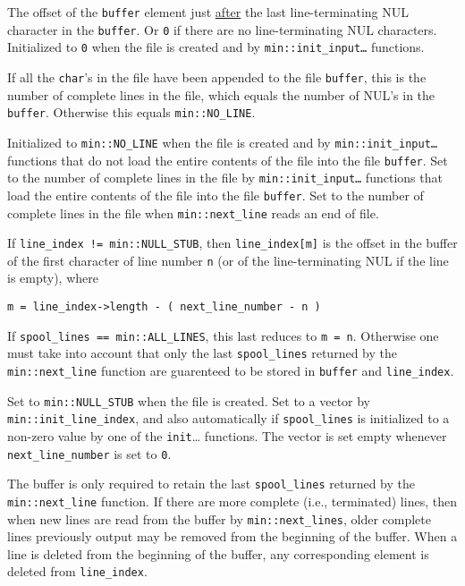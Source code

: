 \documentclass[12pt]{article}
\makeatletter
\newcommand{\ttmkey}[2]{{\tt \bf #1}\index{#1@{\tt #1}!#2}}
\newcommand{\EOL}{\penalty \exhyphenpenalty}
\newenvironment{itemlist}[1][1.2in]%
	{\begin{list}{}{\setlength{\labelwidth}{#1}%
		        \setlength{\leftmargin}{\labelwidth}%
		        \addtolength{\leftmargin}{+0.2in}%
		        \renewcommand{\makelabel}[1]{##1\hfill}}}%
	{\end{list}}
\makeatother
\begin{document}
\begin{itemlist}[1.4in]
\item[\ttmkey{end\_\EOL offset}{in {\tt min::file}}]
The offset of the {\tt buffer} element just \underline{after} the last
line-terminating NUL character in the {\tt buffer}.  Or {\tt 0} if there
are no line-terminating NUL characters.
Initialized to {\tt 0} when the file is created and by
{\tt min::\EOL init\_\EOL input\ldots} functions.

\item[\ttmkey{file\_\EOL lines}{in {\tt min::file}}]
If all the {\tt char}'s in the file have been appended to the file {\tt buffer},
this is the number of complete lines in the file, which equals
the number of NUL's in the {\tt buffer}.  Otherwise this equals
{\tt min::\EOL NO\_\EOL LINE}.

Initialized to {\tt min::\EOL NO\_\EOL LINE} when the file is created and by
{\tt min::\EOL init\_\EOL input\ldots} functions that do not load
the entire contents of the file into the file {\tt buffer}.
Set to the number of complete lines in the file
by {\tt min::\EOL init\_\EOL input\ldots} functions that load
the entire contents of the file into the file {\tt buffer}.
Set to the number of complete lines in the file
when {\tt min::\EOL next\_\EOL line} reads an end of file.

\item[\ttmkey{line\_\EOL index}{in {\tt min::file}}]
If {\tt line\_index~!=~min::NULL\_STUB}, then
{\tt line\_index[m]} is the offset in the buffer of the first
character of line number {\tt n} (or of the line-terminating NUL
if the line is empty), where
\begin{center}
{\tt m = line\_index->length - ( next\_line\_number - n )}
\end{center}
If {\tt spool\_lines~==~min::ALL\_LINES}, this last reduces to {\tt m~=~n}.
Otherwise one must take into account that only the last
{\tt spool\_\EOL lines} returned by the {\tt min::\EOL next\_\EOL line}
function are guarenteed to be
stored in {\tt buffer} and {\tt line\_\EOL index}.

Set to {\tt min::NULL\_STUB} when the file is created.
Set to a vector by {\tt min::\EOL init\_\EOL line\_\EOL index}, and
also automatically if {\tt spool\_\EOL lines} is initialized
to a non-zero value by one of the {\tt init}\ldots{} functions.
The vector is set empty whenever {\tt next\_\EOL line\_\EOL number}
is set to {\tt 0}.

\item[\ttmkey{spool\_\EOL lines}{in {\tt min::file}}]
The buffer is only required to retain the last {\tt spool\_\EOL lines}
returned by the {\tt min::\EOL next\_\EOL line} function.
If there are more complete (i.e., terminated)
lines, then when new lines are read from the buffer
by {\tt min::\EOL next\_\EOL lines},
older complete lines previously
output may be removed from the beginning of the buffer.
When a line is deleted from the beginning of the buffer, any
corresponding element is deleted from {\tt line\_\EOL index}.


\end{itemlist}
\end{document}
